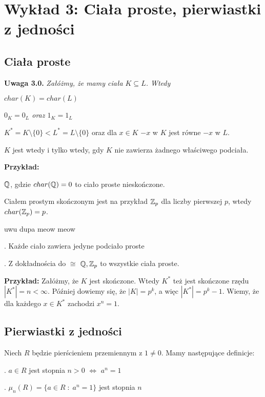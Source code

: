 
\section{Wykład 3: Ciała proste, pierwiastki z jedności}

\subsection{Ciała proste}

\textbf{\large\color{yellow}Uwaga 3.0.}
    \emph{Załóżmy, że mamy ciała $K\subseteq L$. Wtedy}

\indent \point $char(K)=char(L)$

\indent \point \emph{$0_K=0_L$ oraz $1_K=1_L$}

\indent \point $K^*=K\setminus\{0\}<L^*=L\setminus\{0\}$ oraz dla $x\in K$ $-x$ w $K$ jest równe $-x$ w $L$.
\medskip

$K$ jest  wtedy i tylko wtedy, gdy $K$ nie zawierza żadnego właściwego podciała. 

\textbf{Przykład:}

\indent \point $\mathbb{Q}$, gdzie $char(\mathbb{Q})=0$ to ciało proste nieskończone.

\indent \point Ciałem prostym skończonym jest na przykład $\mathbb{Z}_p$ dla liczby pierwszej $p$, wtedy $char(\mathbb{Z}_p)=p$.

\begin{uwaga}{\color{back}uwu dupa meow meow}

. Każde ciało zawiera jedyne podciało proste

. Z dokładnościa do $\cong$ $\mathbb{Q},\mathbb{Z}_p$ to wszystkie ciała proste.
\end{uwaga}

\textbf{Przykład:} Załóżmy, że $K$ jest skończone. Wtedy $K^*$ też jest skończone rzędu $|K^*|=n<\infty$. Później dowiemy się, że $|K|=p^k$, a więc $|K^*|=p^k-1$. Wiemy, że dla każdego $x\in K^*$ zachodzi $x^n=1$.

\subsection{Pierwiastki z jedności}

Niech $R$ będzie pierścieniem przemiennym z $1\neq0$. Mamy następujące definicje:

. $a\in R$ jest stopnia $n>0$ $\iff$ $a^n=1$

. $\mu_n(R)=\{a\in R\;:\;a^n=1\}$ jest  stopnia $n$


